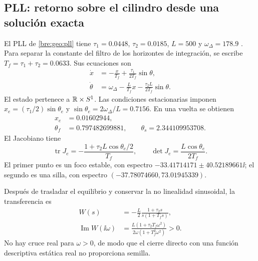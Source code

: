 \subsection{PLL: retorno sobre el cilindro desde una solución exacta}
\label{bre:res:pll}

El PLL de \eqref{bre:geo:pll} tiene
\(\tau_1=0.0448\), \(\tau_2=0.0185\), \(L=500\) y
\(\omega_\Delta=178.9\) \cite{pll2015}. Para separar la constante del
filtro de los horizontes de integración, se escribe
\(T_f=\tau_1+\tau_2=0.0633\). Sus ecuaciones son
\begin{equation}
 \begin{aligned}
 \dot x&=-\frac{x}{T_f}+\frac{\tau_1}{2T_f}\sin\theta,\\
 \dot\theta&=\omega_\Delta-\frac L{T_f}x
                    -\frac{\tau_2L}{2T_f}\sin\theta.
 \end{aligned}
 \label{bre:res:pll-field}
\end{equation}
El estado pertenece a \(\mathbb R\times S^1\). Las condiciones estacionarias
imponen \(x_e=(\tau_1/2)\sin\theta_e\) y
\(\sin\theta_e=2\omega_\Delta/L=0.7156\). En una vuelta se obtienen
\[
 \begin{aligned}
 x_e&=0.01602944,\\
 \theta_f&=0.797482699881,\qquad
 \theta_s=2.344109953708.
 \end{aligned}
\]
El Jacobiano tiene
\[
 \operatorname{tr}J_e=-\frac{1+\tau_2L\cos\theta_e/2}{T_f},\qquad
 \det J_e=\frac{L\cos\theta_e}{2T_f}.
\]
El primer punto es un foco estable, con espectro
\(-33.41714171\pm40.52189661\ii\); el segundo es una silla, con espectro
\((-37.78074660,73.01945339)\).

Después de trasladar el equilibrio y conservar la no linealidad sinusoidal,
la transferencia es
\[
 \begin{aligned}
 W(s)&=-\frac L2\frac{1+\tau_2s}{s(1+T_fs)},\\
 \operatorname{Im}W(\ii\omega)
 &=\frac{L(1+\tau_2T_f\omega^2)}{2\omega(1+T_f^2\omega^2)}>0.
 \end{aligned}
\]
No hay cruce real para \(\omega>0\), de modo que el cierre directo con
una función descriptiva estática real no proporciona semilla.

